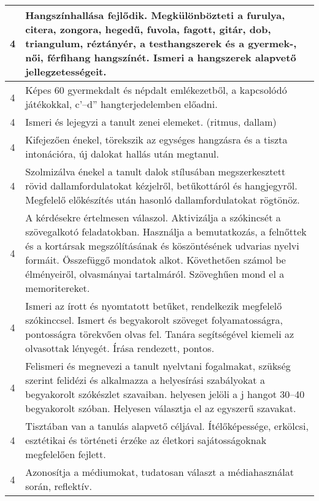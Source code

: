 \begin{longtable}{c | p{12cm} }
                                
                                          4 &  Hangszínhallása fejlődik. Megkülönbözteti a furulya, citera, zongora, hegedű, fuvola, fagott, gitár, dob, triangulum, réztányér, a testhangszerek és a gyermek-, női, férfihang hangszínét. Ismeri a hangszerek alapvető jellegzetességeit. \\ \hline
                                          4 &  Képes 60 gyermekdalt és népdalt emlékezetből, a kapcsolódó játékokkal, c’–d” hangterjedelemben előadni. \\ \hline
                                          4 &  Ismeri és lejegyzi a tanult zenei elemeket. (ritmus, dallam) \\ \hline
                                          4 &  Kifejezően énekel, törekszik az egységes hangzásra és a tiszta intonációra, új dalokat hallás után megtanul. \\ \hline
                                          4 &  Szolmizálva énekel a tanult dalok stílusában megszerkesztett rövid dallamfordulatokat kézjelről, betűkottáról és hangjegyről. Megfelelő előkészítés után hasonló dallamfordulatokat rögtönöz. \\ \hline
                                          4 &  A kérdésekre értelmesen válaszol. Aktivizálja a szókincsét a szövegalkotó feladatokban. Használja a bemutatkozás, a felnőttek és a kortársak megszólításának és köszöntésének udvarias nyelvi formáit. Összefüggő mondatok alkot. Követhetően számol be élményeiről, olvasmányai tartalmáról. Szöveghűen mond el a memoritereket. \\ \hline
                                          4 &  Ismeri az írott és nyomtatott betűket, rendelkezik megfelelő szókinccsel. Ismert és begyakorolt szöveget folyamatosságra, pontosságra törekvően olvas fel. Tanára segítségével kiemeli az olvasottak lényegét. Írása rendezett, pontos. \\ \hline
                                          4 &  Felismeri és megnevezi a tanult nyelvtani fogalmakat, szükség szerint felidézi és alkalmazza a helyesírási szabályokat a begyakorolt szókészlet szavaiban. helyesen jelöli a j hangot 30–40 begyakorolt szóban. Helyesen választja el az egyszerű szavakat. \\ \hline
                                          4 &  Tisztában van a tanulás alapvető céljával. Ítélőképessége, erkölcsi, esztétikai és történeti érzéke az életkori sajátosságoknak megfelelően fejlett. \\ \hline
                                          4 &  Azonosítja a médiumokat, tudatosan választ a médiahasználat során, reflektív. \\ \hline

\end{longtable}
